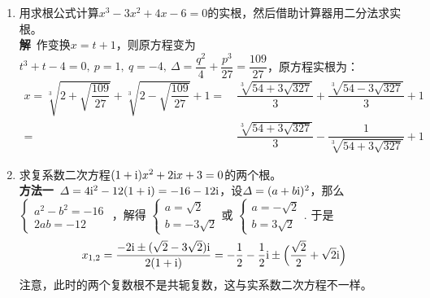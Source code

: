 \begin{enumerate}[label={【\textbf{例\thechapter.\arabic*}】},
 leftmargin=\inteval{\myenumleftmargin}pt,
 itemsep=\inteval{\myenumitempsep}pt,
 itemindent=\inteval{\myenumitemindent}pt]
\item 用求根公式计算$ x^3-3x^2+4x-6=0 $的实根，然后借助计算器用二分法求实根。\\
\textbf{解}\ 作变换$ x=t+1 $，则原方程变为$ t^3+t-4=0,\ p=1,\ q=-4,\ 
\Delta=\dfrac{q^2}{4}+\dfrac{p^3}{27}=\dfrac{109}{27} $，原方程实根为：
\begin{align*}
    x =\sqrt[3]{2+\sqrt{\dfrac{109}{27}}}+\sqrt[3]{2-\sqrt{\dfrac{109}{27}}}+1  
    =&\  \dfrac{\sqrt[3]{54+3\sqrt{327}}}{3}+\dfrac{\sqrt[3]{54-3\sqrt{327}}}{3}+1 \\
    =&\  \dfrac{\sqrt[3]{54+3\sqrt{327}}}{3}-\dfrac{1}{\sqrt[3]{54+3\sqrt{327}}}+1
\end{align*}

\item 求复系数二次方程$ (1+\mathrm{i})x^2+2\mathrm{i} x+3=0 $的两个根。\\
\textbf{方法一}\ $ \Delta=4\mathrm{i}^2-12(1+\mathrm{i})=-16-12\mathrm{i} $，设$ \Delta=(a+b\mathrm{i})^2 $，那么
$ \begin{cases}
    a^2-b^2 =-16 \\
    2ab =-12
\end{cases} $ ，解得
$ \begin{cases}
    a=\sqrt{2} \\
    b=-3\sqrt{2}
\end{cases} $或
$ \begin{cases}
    a=-\sqrt{2} \\
    b=3\sqrt{2}
\end{cases} $. 
于是
\begin{gather*}
    x_{1,2}=\dfrac{-2\mathrm{i}\pm (\sqrt{2}-3\sqrt{2})\mathrm{i}}{2(1+\mathrm{i})}=-\dfrac{1}{2}
    -\dfrac{1}{2}\mathrm{i}\pm \Big(\dfrac{\sqrt{2}}{2}+\sqrt{2} \mathrm{i}\Big)
\end{gather*}
注意，此时的两个复数根不是共轭复数，这与实系数二次方程不一样。


\end{enumerate}
